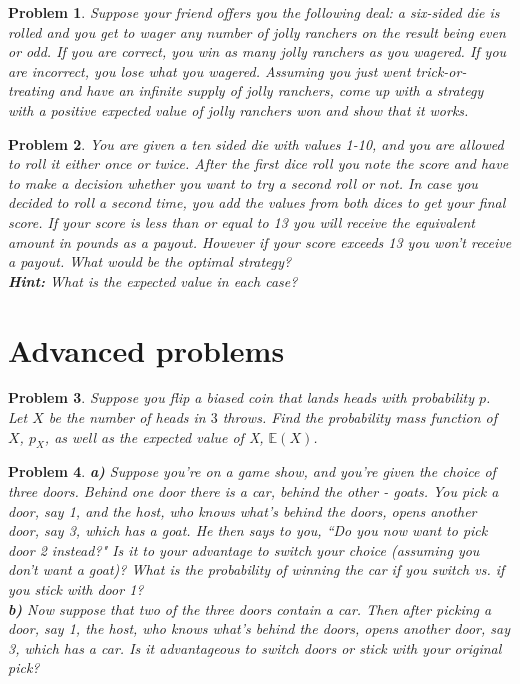 \documentclass[a4paper,12pt]{article}
\theoremstyle{perfect}
\newtheorem{prb}{Problem}
\newcommand{\EE}{\mathbb{E}}
\begin{document}
\begin{prb}
Suppose your friend offers you the following deal: a six-sided die is rolled and you get to wager any number of jolly ranchers on the result being even or odd. If you are correct, you win as many jolly ranchers as you wagered. If you are incorrect, you lose what you wagered. 
Assuming you just went trick-or-treating and have an infinite supply of jolly ranchers, come up with a strategy with a positive expected value of jolly ranchers won and show that it works. 
\end{prb}

\begin{prb}
You are given a ten sided die with values 1-10, and you are allowed to roll it either once or twice.
After the first dice roll you note the score and have to make a decision whether you want to try a second roll or not.
In case you decided to roll a second time, you add the values from both dices to get your final score.
If your score is less than or equal to 13 you will receive the equivalent amount in pounds as a payout. However if your score exceeds 13 you won't receive a payout.
What would be the optimal strategy? \\
\textbf{Hint:} What is the expected value in each case?
\end{prb}



\section{Advanced problems}

\begin{prb}
Suppose you flip a biased coin that lands heads with probability $p$. Let $X$ be the number of heads in $3$ throws. Find the probability mass function of $X$, $p_X$, as well as the expected value of X, $\EE(X)$.
\end{prb}
 
 \begin{prb} 
\textbf{a)} Suppose you're on a game show, and you're given the choice of three doors. Behind one door there is a car, behind the other - goats. You pick a door, say 1, and the host, who knows what's behind the doors, opens another door, say 3, which has a goat. He then says to you, ``Do you now want to pick door 2 instead?" Is it to your advantage to switch your choice (assuming you don't want a goat)? What is the probability of winning the car if you switch vs. if you stick with door 1? \\
\noindent
\textbf{b)} Now suppose that two of the three doors contain a car. Then after picking a door, say 1, the host, who knows what's behind the doors, opens another door, say 3, which has a car. Is it advantageous to switch doors or stick with your original pick?
 \end{prb}
\end{document}
